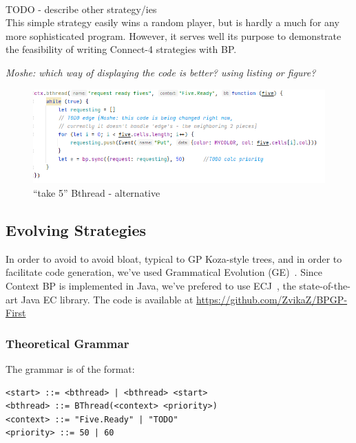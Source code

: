 \documentclass{article}
\begin{document}
        {~\\ \large TODO - describe other strategy/ies}\\

    This simple strategy easily wins a random player, but is hardly a much for any more sophisticated program. However,
    it serves well its purpose to demonstrate the feasibility of writing Connect-4 strategies with BP.

    \emph{Moshe: which way of displaying the code is better? using \emph{listing} or \emph{figure}?}

    

    \begin{figure}[h]
        \includegraphics[width=\textwidth]{five_bt}
        \caption{``take 5'' Bthread - alternative}
        \label{fig:take-5-bt-fig}
    \end{figure}


    \subsection{Evolving Strategies}
    In order to avoid to avoid bloat, typical to GP Koza-style trees, and in order to facilitate code generation, we've
    used Grammatical Evolution (GE)~\cite{ONeill2001}. Since Context BP is implemented in Java, we've prefered to use
    ECJ~\cite{Luke1998ECJSoftware}, the state-of-the-art Java EC library. The code is available at \url{https://github.com/ZvikaZ/BPGP-First}

    \subsubsection{Theoretical Grammar}

    The grammar is of the format:
    \begin{verbatim}
<start> ::= <bthread> | <bthread> <start>
<bthread> ::= BThread(<context> <priority>)
<context> ::= "Five.Ready" | "TODO"
<priority> ::= 50 | 60
    \end{verbatim}
\end{document}
